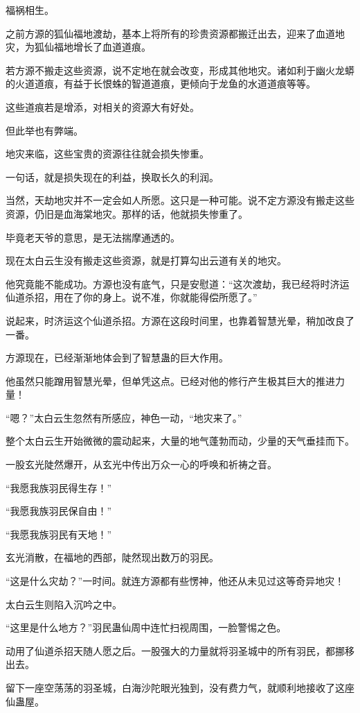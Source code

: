 \begin{this_body}
福祸相生。

之前方源的狐仙福地渡劫，基本上将所有的珍贵资源都搬迁出去，迎来了血道地灾，为狐仙福地增长了血道道痕。

若方源不搬走这些资源，说不定地在就会改变，形成其他地灾。诸如利于幽火龙蟒的火道道痕，有益于长恨蛛的智道道痕，更倾向于龙鱼的水道道痕等等。

这些道痕若是增添，对相关的资源大有好处。

但此举也有弊端。

地灾来临，这些宝贵的资源往往就会损失惨重。

一句话，就是损失现在的利益，换取长久的利润。

当然，天劫地灾并不一定会如人所愿。这只是一种可能。说不定方源没有搬走这些资源，仍旧是血海棠地灾。那样的话，他就损失惨重了。

毕竟老天爷的意思，是无法揣摩通透的。

现在太白云生没有搬走这些资源，就是打算勾出云道有关的地灾。

他究竟能不能成功。方源也没有底气，只是安慰道：“这次渡劫，我已经将时济运仙道杀招，用在了你的身上。说不准，你就能得偿所愿了。”

说起来，时济运这个仙道杀招。方源在这段时间里，也靠着智慧光晕，稍加改良了一番。

方源现在，已经渐渐地体会到了智慧蛊的巨大作用。

他虽然只能蹭用智慧光晕，但单凭这点。已经对他的修行产生极其巨大的推进力量！

“嗯？”太白云生忽然有所感应，神色一动，“地灾来了。”

整个太白云生开始微微的震动起来，大量的地气蓬勃而动，少量的天气垂挂而下。

一股玄光陡然爆开，从玄光中传出万众一心的呼唤和祈祷之音。

“我愿我族羽民得生存！”

“我愿我族羽民保自由！”

“我愿我族羽民有天地！”

玄光消散，在福地的西部，陡然现出数万的羽民。

“这是什么灾劫？”一时间。就连方源都有些愣神，他还从未见过这等奇异地灾！

太白云生则陷入沉吟之中。

“这里是什么地方？”羽民蛊仙周中连忙扫视周围，一脸警惕之色。

动用了仙道杀招天随人愿之后。一股强大的力量就将羽圣城中的所有羽民，都挪移出去。

留下一座空荡荡的羽圣城，白海沙陀眼光独到，没有费力气，就顺利地接收了这座仙蛊屋。


\end{this_body}
